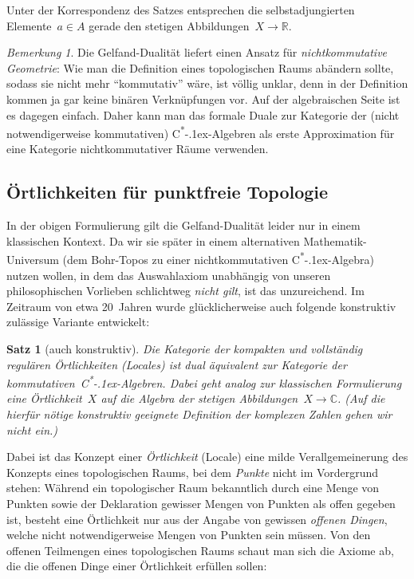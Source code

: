 \documentclass[a4paper,ngerman,12pt]{scrartcl}
\theoremstyle{definition}
\theoremstyle{plain}
\newtheorem{satz}[defn]{Satz}
\theoremstyle{remark}
\newtheorem{bem}[defn]{Bemerkung}
\newcommand{\RR}{\mathbb{R}}
\newcommand{\CC}{\mathbb{C}}
\newcommand{\csalgebra}{C\textsuperscript{*}\kern-.1ex-Algebra}
\newcommand{\csalgebren}{C\textsuperscript{*}\kern-.1ex-Alge\-bren}
\renewcommand{\_}{\mathpunct{.}\,}
\newcommand{\?}{\,{:}\,}
\begin{document}
Unter der Korrespondenz des Satzes entsprechen die selbstadjungierten
Elemente~$a \in A$ gerade den stetigen Abbildungen~$X \to \RR$.

\begin{bem}Die Gelfand-Dualität liefert einen Ansatz für \emph{nichtkommutative
Geometrie}: Wie man die Definition eines topologischen Raums abändern sollte,
sodass sie nicht mehr "`kommutativ"' wäre, ist völlig unklar, denn in
der Definition kommen ja gar keine binären Verknüpfungen vor. Auf der algebraischen Seite
ist es dagegen einfach. Daher kann man das formale Duale zur Kategorie der
(nicht notwendigerweise kommutativen) \csalgebren{} als erste Approximation für
eine Kategorie nichtkommutativer Räume verwenden.
\end{bem}


\subsection{Örtlichkeiten für punktfreie Topologie}

In der obigen Formulierung gilt die Gelfand-Dualität leider nur in einem
klassischen Kontext. Da wir sie später in einem alternativen
Mathematik-Universum (dem Bohr-Topos zu einer nichtkommutativen \csalgebra)
nutzen wollen, in dem das Auswahlaxiom unabhängig von unseren philosophischen
Vorlieben schlichtweg \emph{nicht gilt}, ist das unzureichend. Im Zeitraum von
etwa 20~Jahren wurde glücklicherweise auch folgende konstruktiv zulässige Variante
entwickelt:

\begin{satz}[auch konstruktiv]Die Kategorie der kompakten und vollständig
regulären Örtlichkeiten (Locales) ist dual äquivalent zur Kategorie der
kommutativen~\csalgebren. Dabei geht analog zur klassischen Formulierung eine
Örtlichkeit~$X$ auf die Algebra der stetigen Abbildungen~$X \to \CC$.
(Auf die hierfür nötige konstruktiv geeignete Definition der komplexen Zahlen
gehen wir nicht ein.)
\end{satz}

Dabei ist das Konzept einer \emph{Örtlichkeit} (Locale) eine milde
Verallgemeinerung des Konzepts eines topologischen Raums, bei dem \emph{Punkte}
nicht im Vordergrund stehen: Während ein topologischer Raum bekanntlich durch
eine Menge von Punkten sowie der Deklaration gewisser Mengen von Punkten als
offen gegeben ist, besteht eine Örtlichkeit nur aus der Angabe von
gewissen \emph{offenen Dingen}, welche nicht notwendigerweise Mengen von
Punkten sein müssen. Von den offenen Teilmengen eines topologischen Raums
schaut man sich die Axiome ab, die die offenen Dinge einer Örtlichkeit
erfüllen sollen:
\end{document}
